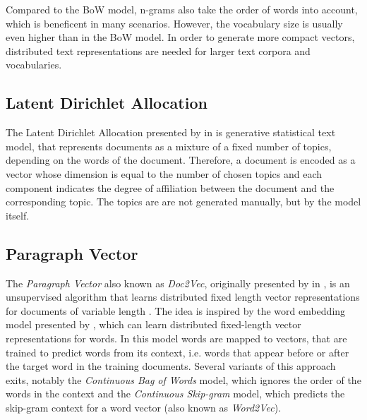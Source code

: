 Compared to the BoW model, n-grams also take the order of words into account, which is beneficent in many scenarios.
However, the vocabulary size is usually even higher than in the BoW model.
In order to generate more compact vectors, distributed text representations are needed for larger text corpora and vocabularies.

\subsection{Latent Dirichlet Allocation}

The Latent Dirichlet Allocation presented by \citeauthor{DBLP:journals/jmlr/BleiNJ03} in \citeyear{DBLP:journals/jmlr/BleiNJ03} \cite{DBLP:journals/jmlr/BleiNJ03} is generative statistical text model, that represents documents as a mixture of a fixed number of topics, depending on the words of the document.
Therefore, a document is encoded as a vector whose dimension is equal to the number of chosen topics and each component indicates the degree of affiliation between the document and the corresponding topic.
The topics are are not generated manually, but by the model itself.

\subsection{Paragraph Vector}

The \textit{Paragraph Vector} also known as \textit{Doc2Vec}, originally presented by \citeauthor{DBLP:conf/icml/LeM14} in \citeyear{DBLP:conf/icml/LeM14}, is an unsupervised algorithm that learns distributed fixed length vector representations for documents of variable length \cite{DBLP:conf/icml/LeM14}.
The idea is inspired by the word embedding model presented by \citeauthor{DBLP:journals/jmlr/BengioDVJ03} \cite{DBLP:journals/jmlr/BengioDVJ03}, which can learn distributed fixed-length vector representations for words.
In this model words are mapped to vectors, that are trained to predict words from its context, i.e. words that appear before or after the target word in the training documents.
Several variants of this approach exits, notably the \textit{Continuous Bag of Words} model, which ignores the order of the words in the context and the \textit{Continuous Skip-gram} model, which predicts the skip-gram context for a word vector (also known as \textit{Word2Vec})\cite{DBLP:journals/corr/abs-1301-3781}.


